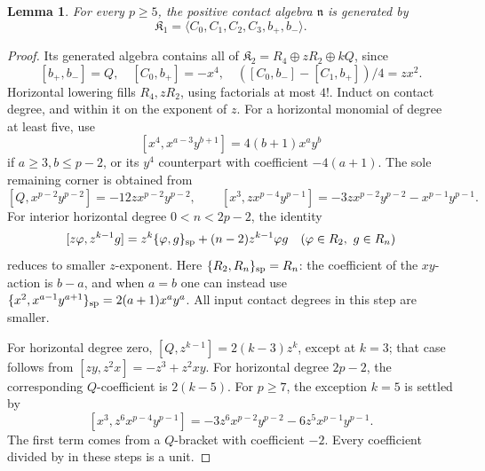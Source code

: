 \documentclass[11pt]{article}
\theoremstyle{plain}
\newtheorem{lemma}[lemma]{Lemma}
\theoremstyle{definition}
\theoremstyle{remark}
\numberwithin{equation}{section}
\newcommand{\kk}{k}
\newcommand{\Kalg}{\mathfrak K}
\begin{document}
\begin{lemma}\label{lem:degree-one-generation}
For every $p\ge5$, the positive contact algebra $\mathfrak n$ is generated by
\[
 \Kalg_1=\langle C_0,C_1,C_2,C_3,b_+,b_-\rangle.
\]
\end{lemma}
\begin{proof}
Its generated algebra contains all of
\(\Kalg_2=R_4\oplus zR_2\oplus\kk Q\), since
\[
 {[b_+,b_-]}=Q,\quad [C_0,b_+]=-x^4,\quad
 ([C_0,b_-]-[C_1,b_+])/4=zx^2 .
\]
Horizontal lowering fills \(R_4,zR_2\), using factorials at most \(4!\).
Induct on contact degree, and within it on the exponent of \(z\).
For a horizontal monomial of degree at least five, use
\[
 {[x^4,x^{a-3}y^{b+1}]}=4(b+1)x^ay^b
\]
if \(a\ge3,b\le p-2\), or its \(y^4\) counterpart
with coefficient \(-4(a+1)\).
The sole remaining corner is obtained from
\[
 {[Q,x^{p-2}y^{p-2}]}=-12zx^{p-2}y^{p-2},\qquad
 {[x^3,zx^{p-4}y^{p-1}]}
       =-3zx^{p-2}y^{p-2}-x^{p-1}y^{p-1}.
\]
For interior horizontal degree \(0<n<2p-2\), the identity
\[
 {[z\varphi,z^{k-1}g]}
   =z^k\{\varphi,g\}_{\rm sp}+(n-2)z^{k-1}\varphi g
       \quad(\varphi\in R_2,\ g\in R_n)
\]
reduces to smaller \(z\)-exponent.
Here \(\{R_2,R_n\}_{\rm sp}=R_n\): the coefficient of the
\(xy\)-action is \(b-a\), and when \(a=b\) one can instead use
\(\{x^2,x^{a-1}y^{a+1}\}_{\rm sp}=2(a+1)x^ay^a\).
All input contact degrees in this step are smaller.

For horizontal degree zero,
\([Q,z^{k-1}]=2(k-3)z^k\), except at \(k=3\);
that case follows from \([zy,z^2x]=-z^3+z^2xy\).
For horizontal degree \(2p-2\), the corresponding \(Q\)-coefficient
is \(2(k-5)\).
For \(p\ge7\), the exception \(k=5\) is settled by
\[
 {[x^3,z^6x^{p-4}y^{p-1}]}
   =-3z^6x^{p-2}y^{p-2}-6z^5x^{p-1}y^{p-1}.
\]
The first term comes from a \(Q\)-bracket with
coefficient \(-2\).
Every coefficient divided by in these steps is a unit.
\end{proof}
\end{document}
